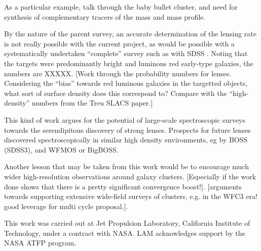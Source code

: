 \message{ !name(clashresolved.tex)}\documentclass{emulateapj}
\begin{document}
As a particular example, talk through the baby bullet cluster, and
need for synthesis of complementary tracers of the mass and mass
profile. 

By the nature of the parent survey, an accurate determination of the
lensing rate is not really possible with the current project, as would
be possible with a systematically undertaken ``complete'' survey such
as with SDSS \citep[e.g][]{dobler:08}.  Noting that the targets were
predominantly bright and luminous red early-type galaxies, the numbers
are XXXXX.  [Work through the probability numbers for
lenses. Considering the ``bias'' towards red luminous galaxies in the
targetted objects, what sort of surface density does this correspond
to?  Compare with the ``high-density'' numbers from the Treu SLACS
paper.]

This kind of work argues for the potential of large-scale
spectroscopic surveys towards the serendipitous discovery of strong
lenses.  Prospects for future lenses discovered spectroscopically in
similar high density environments, eg by BOSS (SDSS3), and WFMOS or
BigBOSS. 

Another lesson that may be taken from this work would be to encourage
much wider high-resolution observations around galaxy clusters.
[Especially if the work done shows that there is a pretty significant
convergence boost!].  [arguments towards supporting extensive
wide-field surveys of clusters, e.g. in the WFC3 era! good leverage
for multi cycle proposal.]. 

\acknowledgements

This work was carried out at Jet Propulsion Laboratory, California
Institute of Technology, under a contract with NASA.  LAM acknowledges
support by the NASA ATFP program.



\end{document}
